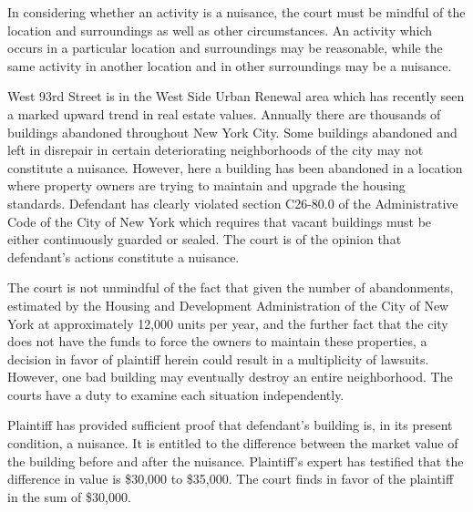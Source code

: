 In considering whether an activity is a nuisance, the court must be mindful of
the location and surroundings as well as other circumstances. An activity which
occurs in a particular location and surroundings may be reasonable, while the
same activity in another location and in other surroundings may be a nuisance.

West 93rd Street is in the West Side Urban Renewal area which has recently seen
a marked upward trend in real estate values. Annually there are thousands of
buildings abandoned throughout New York City. Some buildings abandoned and left
in disrepair in certain deteriorating neighborhoods of the city may not
constitute a nuisance. However, here a building has been abandoned in a location
where property owners are trying to maintain and upgrade the housing standards.
Defendant has clearly violated section C26-80.0 of the Administrative Code of
the City of New York which requires that vacant buildings must be either
continuously guarded or sealed. The court is of the opinion that defendant's
actions constitute a nuisance.

The court is not unmindful of the fact that given the number of abandonments,
estimated by the Housing and Development Administration of the City of New York
at approximately 12,000 units per year, and the further fact that the city does
not have the funds to force the owners to maintain these properties, a decision
in favor of plaintiff herein could result in a multiplicity of lawsuits.
However, one bad building may eventually destroy an entire neighborhood. The
courts have a duty to examine each situation independently.

Plaintiff has provided sufficient proof that defendant's building is, in its
present condition, a nuisance. It is entitled to the difference between the
market value of the building before and after the nuisance. Plaintiff's expert
has testified that the difference in value is \$30,000 to \$35,000. The court
finds in favor of the plaintiff in the sum of \$30,000.

